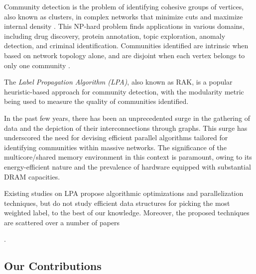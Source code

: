 Community detection is the problem of identifying cohesive groups of vertices, also known as clusters, in complex networks that minimize cuts and maximize internal density \cite{garza2019community}. This NP-hard problem finds applications in various domains, including drug discovery, protein annotation, topic exploration, anomaly detection, and criminal identification. Communities identified are intrinsic when based on network topology alone, and are disjoint when each vertex belongs to only one community \cite{com-gregory10}. The \textit{Label Propagation Algorithm (LPA)}, also known as RAK, \cite{com-blondel08} is a popular heuristic-based approach for community detection, with the modularity metric \cite{com-newman06} being used to measure the quality of communities identified.

In the past few years, there has been an unprecedented surge in the gathering of data and the depiction of their interconnections through graphs. This surge has underscored the need for devising efficient parallel algorithms tailored for identifying communities within massive networks. The significance of the multicore/shared memory environment in this context is paramount, owing to its energy-efficient nature and the prevalence of hardware equipped with substantial DRAM capacities. Existing studies on LPA propose algorithmic optimizations and parallelization techniques, but do not study efficient data structures for picking the most weighted label, to the best of our knowledge. Moreover, the proposed techniques are scattered over a number of papers.




\subsection{Our Contributions}

